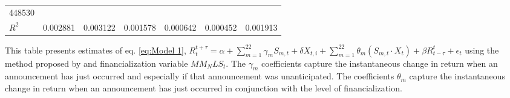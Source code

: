 \begin{sidewaystable}
{\begin{tabular}{@{}lllllllllllll@{}}
\multicolumn{2}{c}{ 448530 }                                                 \\ \textbf{$R^2$}             &\multicolumn{2}{c}{ 0.002881 }                                                 & \multicolumn{2}{c}{ 0.003122 }                                                 & \multicolumn{2}{c}{ 0.001578 }                                                 & \multicolumn{2}{c}{ 0.000642 }                                                 & \multicolumn{2}{c}{ 0.000452 }                                                   & \multicolumn{2}{c}{ 0.001913 }                                                 \\ \bottomrule 
\end{tabular}
}
\begin{tablenotes}\item 
    \singlespacing
    \footnotesize
    This table presents estimates of eq. \ref{eq:Model 1}, $R_{t}^{t+\tau}=\alpha+\sum_{m=1}^{22} \gamma_m S_{m,t}+ \delta X_{t,i} + \sum_{m=1}^{22} \theta_m (S_{m,t} \cdot X_t)+\beta R_{t-\tau}^{t}+\epsilon_{t}$ using the method proposed by \citet{kurov2019price} and financialization variable $MM_NLS_t$. The $\gamma_m$ coefficients capture the instantaneous change in return when an announcement has just occurred and especially if that announcement was unanticipated. The coefficients $\theta_m$ capture the instantaneous change in return when an announcement has just occurred in conjunction with the level of financialization.
\end{tablenotes}
\end{sidewaystable}

